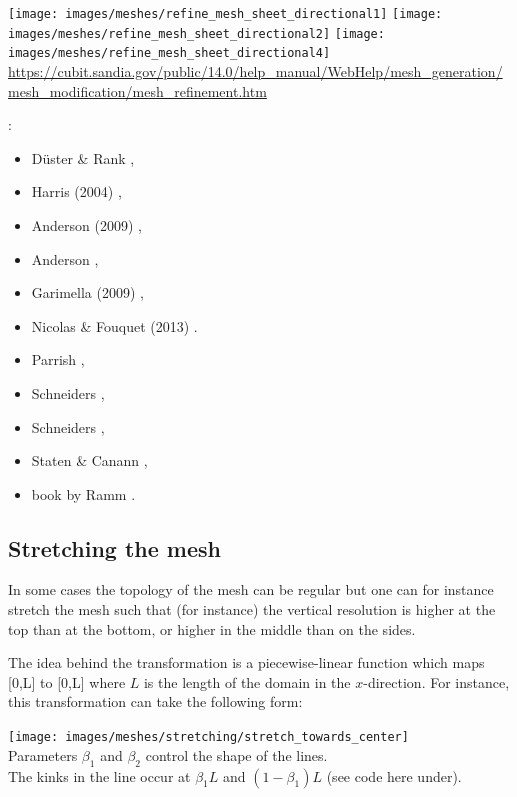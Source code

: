 \begin{center}
\texttt{[image: images/meshes/refine\_mesh\_sheet\_directional1]}
\texttt{[image: images/meshes/refine\_mesh\_sheet\_directional2]}
\texttt{[image: images/meshes/refine\_mesh\_sheet\_directional4]}\\
\url{https://cubit.sandia.gov/public/14.0/help_manual/WebHelp/mesh_generation/mesh_modification/mesh_refinement.htm}
\end{center}

\Literature:
\begin{itemize}
\item D{\"u}ster \& Rank \cite{dura01},
\item Harris \etal (2004) \cite{habo04},
\item Anderson \etal (2009) \cite{anbo09},
\item Anderson \cite{ande09}, 
\item Garimella (2009) \cite{gari09},
\item Nicolas \& Fouquet (2013) \cite{nifo13,nifo13b}.
\item Parrish \cite{parr07}, 
\item Schneiders \cite{schn00,schn96,schn96b,schn99},
\item Schneiders \etal \cite{scde95},
\item Staten \& Canann \cite{stca97},
\item book by Ramm \etal \cite{rarr03}.
\end{itemize}

\subsection{Stretching the mesh}

In some cases the topology of the mesh can be regular but one can for instance stretch 
the mesh such that (for instance) the vertical resolution is higher at the top than at the bottom, 
or higher in the middle than on the sides.

The idea behind the transformation is a piecewise-linear function which maps [0,L] to [0,L] where 
$L$ is the length of the domain in the $x$-direction. For instance, this transformation can take the following form:

\begin{center}
\texttt{[image: images/meshes/stretching/stretch\_towards\_center]}\\
{\captionfont Parameters $\beta_1$ and $\beta_2$ control the shape of the lines.\\ 
The kinks in the line occur at $\beta_1 L$ and $(1-\beta_1)L$ (see code here under).}
\end{center}

